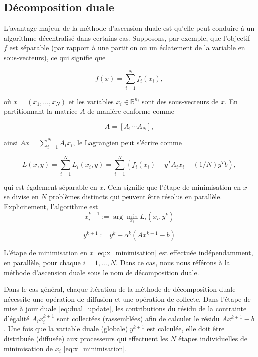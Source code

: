 \subsection{Décomposition duale}
L'avantage majeur de la méthode d'ascension duale est qu'elle peut conduire à un algorithme décentralisé dans certains cas. Supposons, par exemple, que l'objectif \( f \) est séparable (par rapport à une partition ou un éclatement de la variable en sous-vecteurs), ce qui signifie que

\begin{equation}f(x) = \sum_{i=1}^N f_i(x_i),\end{equation}

où \( x = (x_1, \ldots, x_N) \) et les variables \( x_i \in \mathbb{R}^{n_i} \) sont des sous-vecteurs de \( x \). En partitionnant la matrice \( A \) de manière conforme comme

\begin{equation}A = [A_1 \cdots A_N],\end{equation}

ainsi \( Ax = \sum_{i=1}^N A_i x_i \), le Lagrangien peut s'écrire comme

\begin{equation}L(x, y) = \sum_{i=1}^N L_i(x_i, y) = \sum_{i=1}^N \left( f_i(x_i) + y^T A_i x_i - (1/N)y^T b \right),\end{equation}

qui est également séparable en \( x \). Cela signifie que l'étape de minimisation en \( x \) se divise en \( N \) problèmes distincts qui peuvent être résolus en parallèle. Explicitement, l'algorithme est
\begin{equation}
    x_i^{k+1} := \arg\min_{x_i} L_i(x_i, y^k) 
    \label{eq:x_minimisation}
\end{equation}

\begin{equation}
    y^{k+1} := y^k + \alpha^k (Ax^{k+1} - b)
    \label{eq:dual_update}
\end{equation}

L'étape de minimisation en \( x \) \eqref{eq:x_minimisation} est effectuée indépendamment, en parallèle, pour chaque \( i = 1, \ldots, N \). Dans ce cas, nous nous référons à la méthode d'ascension duale sous le nom de décomposition duale.

Dans le cas général, chaque itération de la méthode de décomposition duale nécessite une opération de diffusion et une opération de collecte. Dans l'étape de mise à jour duale \eqref{eq:dual_update}, les contributions du résidu de la contrainte d'égalité \( A_i x_i^{k+1} \) sont collectées (rassemblées) afin de calculer le résidu \( Ax^{k+1} - b \). Une fois que la variable duale (globale) \( y^{k+1} \) est calculée, elle doit être distribuée (diffusée) aux processeurs qui effectuent les \( N \) étapes individuelles de minimisation de \( x_i \) \eqref{eq:x_minimisation}.

